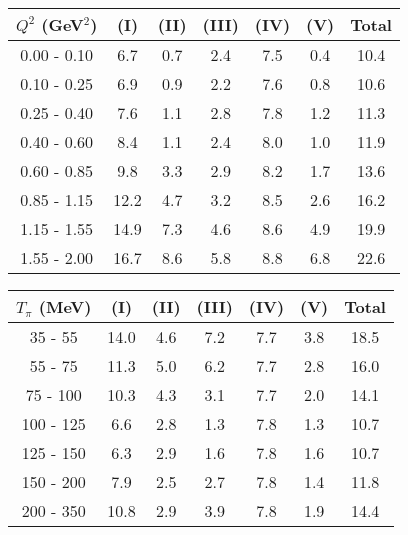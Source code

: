 \documentclass[aps, prd, reprint,showpacs,  preprintnumbers,amsmath,amssymb,superscriptaddress, nofootinbib]{revtex4-1}
\makeatletter
\renewenvironment{table}
  {\def\@captype{table}}
  {}
\makeatother
\begin{document}
\vspace{1cm}

\begin{table}
\centering
\begin{tabular}{ccccccc}
\hline
$Q^{2}$ (GeV$^{2}$) & (I) & (II) & (III) & (IV) & (V) & Total \\
\hline
 0.00 -  0.10 &   6.7  &  0.7  &  2.4  &  7.5  &  0.4  & 10.4  \\
 0.10 -  0.25 &   6.9  &  0.9  &  2.2  &  7.6  &  0.8  & 10.6  \\
 0.25 -  0.40 &   7.6  &  1.1  &  2.8  &  7.8  &  1.2  & 11.3  \\
 0.40 -  0.60 &   8.4  &  1.1  &  2.4  &  8.0  &  1.0  & 11.9  \\
 0.60 -  0.85 &   9.8  &  3.3  &  2.9  &  8.2  &  1.7  & 13.6  \\
 0.85 -  1.15 &  12.2  &  4.7  &  3.2  &  8.5  &  2.6  & 16.2  \\
 1.15 -  1.55 &  14.9  &  7.3  &  4.6  &  8.6  &  4.9  & 19.9  \\
 1.55 -  2.00 &  16.7  &  8.6  &  5.8  &  8.8  &  6.8  & 22.6  \\
\hline\hline

\end{tabular}
\caption{Fractional systematic uncertainties (in percent) on $d\sigma/dQ^2$.}
\label{tb:pip_Q2_err}
\end{table}

\vspace{1cm}

\begin{table}
\centering
\begin{tabular}{ccccccc}
\hline
$T_{\pi}$ (MeV) & (I) & (II) & (III) & (IV) & (V) & Total \\
\hline
35 - 55 &    14.0  &  4.6  &  7.2  &  7.7  &  3.8  & 18.5  \\
55 - 75 &    11.3  &  5.0  &  6.2  &  7.7  &  2.8  & 16.0  \\
75 - 100 &   10.3  &  4.3  &  3.1  &  7.7  &  2.0  & 14.1  \\
100 - 125 &   6.6  &  2.8  &  1.3  &  7.8  &  1.3  & 10.7  \\
125 - 150 &   6.3  &  2.9  &  1.6  &  7.8  &  1.6  & 10.7  \\
150 - 200 &   7.9  &  2.5  &  2.7  &  7.8  &  1.4  & 11.8  \\
200 - 350 &  10.8  &  2.9  &  3.9  &  7.8  &  1.9  & 14.4  \\
\hline\hline
\end{tabular}
\caption{Fractional systematic uncertainties (in percent) on $d\sigma/dT_\pi$.}
\label{tb:pip_kinetic_err}
\end{table}
\end{document}
